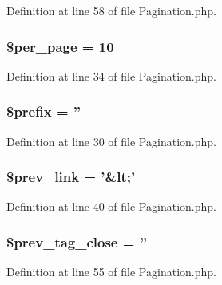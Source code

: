 Definition at line 58 of file Pagination.\-php.

\subsubsection[{\$per\-\_\-page}]{\setlength{\rightskip}{0pt plus 5cm}\$per\-\_\-page = 10}\label{class_c_i___pagination_abece0f3099457a037f8f339811dc6e20}


Definition at line 34 of file Pagination.\-php.

\subsubsection[{\$prefix}]{\setlength{\rightskip}{0pt plus 5cm}\$prefix = ''}\label{class_c_i___pagination_a09e8cf95b9d29955a0bfabca9b420edc}


Definition at line 30 of file Pagination.\-php.

\subsubsection[{\$prev\-\_\-link}]{\setlength{\rightskip}{0pt plus 5cm}\$prev\-\_\-link = '\&{\bf lt};'}\label{class_c_i___pagination_afab5c29a3da82c4dce6a491f1d257831}


Definition at line 40 of file Pagination.\-php.

\subsubsection[{\$prev\-\_\-tag\-\_\-close}]{\setlength{\rightskip}{0pt plus 5cm}\$prev\-\_\-tag\-\_\-close = ''}\label{class_c_i___pagination_abb46001ebebf96f2562ea1f8ced80aa1}


Definition at line 55 of file Pagination.\-php.

